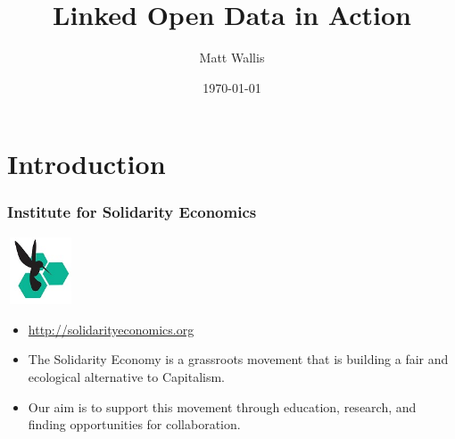 
\usepackage{beamerthemesplit}
\usepackage{textpos} 
\usepackage{hyperref}
\usepackage{graphicx}
\usepackage{calc}
\newlength{\popupimagewidth}

\setlength{\popupimagewidth}{\textwidth*3/5}


\title{Linked Open Data in Action}
\author{Matt Wallis}
\date{\today}



\frame{\titlepage}

\section[Outline]{}
\frame{\tableofcontents}

\section{Introduction}
\frame
{
  \frametitle{Institute for Solidarity Economics}
  \begin{center}
    \includegraphics[height=2cm,width=2cm]{ise-logo.jpg}
  \end{center}
  \begin{itemize}
    \item<1-> \url{http://solidarityeconomics.org}
    \item<1-> The Solidarity Economy is a grassroots movement that is building a fair and ecological alternative to Capitalism.
    \item<1-> Our aim is to support this movement through education, research, and finding opportunities for collaboration.
  \end{itemize}
}
